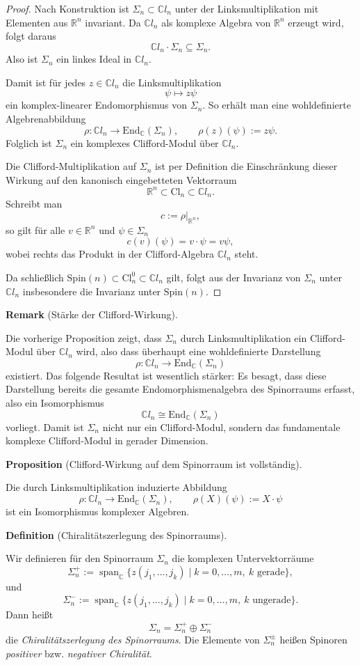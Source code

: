 \documentclass[10pt, letterpaper]{article}
\newcommand{\R}{\mathbb{R}}
\newcommand{\C}{\mathbb{C}}
\newcommand{\End}{\mathrm{End}}
\newcommand{\Cl}{\mathrm{Cl}}
\newcommand{\Spin}{\mathrm{Spin}}
\newcommand{\CustomHeading}[3]{%
  \par\medskip\noindent%
  \textbf{#1 #2} \textnormal{(#3)}.\enskip%
}
\newenvironment{DEF}[2]{\CustomHeading{Definition}{#1}{#2}}{}
\newenvironment{PROP}[2]{\CustomHeading{Proposition}{#1}{#2}}{}
\newenvironment{REM}[2]{\CustomHeading{Remark}{#1}{#2}}{}
\begin{document}
\begin{proof}
Nach Konstruktion ist $\Sigma_n\subset \C l_n$ unter der Linksmultiplikation mit
Elementen aus $\R^n$ invariant. Da $\C l_n$ als komplexe Algebra von $\R^n$
erzeugt wird, folgt daraus
\[
\C l_n\cdot \Sigma_n\subseteq \Sigma_n.
\]
Also ist $\Sigma_n$ ein linkes Ideal in $\C l_n$.

Damit ist für jedes $z\in \C l_n$ die Linksmultiplikation
\[
\psi\longmapsto z\psi
\]
ein komplex-linearer Endomorphismus von $\Sigma_n$. So erhält man eine wohldefinierte
Algebrenabbildung
\[
\rho:\C l_n\longrightarrow \End_{\C}(\Sigma_n),
\qquad
\rho(z)(\psi):=z\psi.
\]
Folglich ist $\Sigma_n$ ein komplexes Clifford-Modul über $\C l_n$.

Die Clifford-Multiplikation auf $\Sigma_n$ ist per Definition die Einschränkung
dieser Wirkung auf den kanonisch eingebetteten Vektorraum
\[
\R^n\subset \Cl_n\subset \C l_n.
\]
Schreibt man
\[
c:=\rho|_{\R^n},
\]
so gilt für alle $v\in \R^n$ und $\psi\in \Sigma_n$
\[
c(v)(\psi)=v\cdot\psi=v\psi,
\]
wobei rechts das Produkt in der Clifford-Algebra $\C l_n$ steht.

Da schließlich $\Spin(n)\subset \Cl_n^0\subset \C l_n$ gilt, folgt aus der
Invarianz von $\Sigma_n$ unter $\C l_n$ insbesondere die Invarianz unter
$\Spin(n)$.
\end{proof}

\begin{REM}{}{Stärke der Clifford-Wirkung}
Die vorherige Proposition zeigt, dass $\Sigma_n$ durch Linksmultiplikation ein
Clifford-Modul über $\C l_n$ wird, also dass überhaupt eine wohldefinierte
Darstellung
\[
\rho:\C l_n\to \End_{\C}(\Sigma_n)
\]
existiert. Das folgende Resultat ist wesentlich stärker: Es besagt, dass diese
Darstellung bereits die gesamte Endomorphismenalgebra des Spinorraums erfasst,
also ein Isomorphismus
\[
\C l_n \cong \End_{\C}(\Sigma_n)
\]
vorliegt. Damit ist $\Sigma_n$ nicht nur ein Clifford-Modul, sondern das
fundamentale komplexe Clifford-Modul in gerader Dimension.
\end{REM}

\begin{PROP}{}{Clifford-Wirkung auf dem Spinorraum ist vollständig}
Die durch Linksmultiplikation induzierte Abbildung
\[
\rho:\C l_n\longrightarrow \End_{\C}(\Sigma_n),\qquad
\rho(X)(\psi):=X\cdot \psi
\]
ist ein Isomorphismus komplexer Algebren.
\end{PROP}



\begin{DEF}{}{Chiralitätszerlegung des Spinorraums}
Wir definieren für den Spinorraum $\Sigma_n$ die komplexen Untervektorräume
\[
\Sigma_n^{+}
:=
\operatorname{span}_{\C}\{z(j_1,\dots,j_k)\mid k=0,\dots,m,\ k \text{ gerade}\},
\]
und
\[
\Sigma_n^{-}
:=
\operatorname{span}_{\C}\{z(j_1,\dots,j_k)\mid k=0,\dots,m,\ k \text{ ungerade}\}.
\]
Dann heißt
\[
\Sigma_n=\Sigma_n^{+}\oplus \Sigma_n^{-}
\]
die \emph{Chiralitätszerlegung des Spinorraums}. Die Elemente von $\Sigma_n^\pm$
heißen Spinoren \emph{positiver} bzw. \emph{negativer Chiralität}.
\end{DEF}
\end{document}
